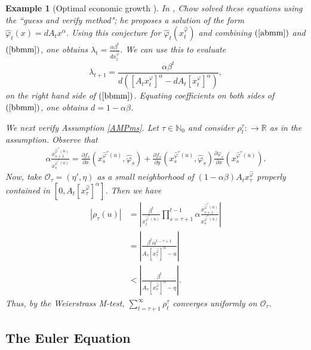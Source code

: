 \documentclass[3p]{elsarticle}
\newcommand{\rz}{\mathbb R}
\newcommand{\nat}{\mathbb N_0}
\newtheorem{examp}[thm]{Example}
\begin{document}
\begin{examp}[Optimal economic growth \cite{EconomicGrowth,Ljungq}]
		
		In \cite[pp.33]{LagrangeMethod}, Chow solved these  equations using the ``guess and verify method"; he proposes a solution of the form ${\hat\varphi}_t(x)=dA_tx^\alpha$. Using this conjecture for $\hat\varphi_t(x_t^{\hat\varphi})$ and combining $(\ref{abmm})$ and $(\ref{bbmm})$, one obtains $\displaystyle\lambda_t=\frac{\alpha\beta^t}{dx_t^{\hat\varphi}}$. We can use this to evaluate $$\displaystyle\lambda_{t+1}=\frac{\alpha\beta^t}{d([A_tx_t^{\varphi}]^\alpha-dA_t[x_t^{\varphi}]^\alpha)},$$ on the right hand side of $(\ref{bbmm})$. Equating coefficients on both sides of $(\ref{bbmm})$, one obtains $d=1-\alpha\beta$. 
		
		We next verify Assumption \ref{AMPms}. Let $\tau\in\nat$ and consider $\rho_t^\tau:\to\rz$ as in the assumption. Observe that 
		\begin{align*}
		\alpha\frac{x_{s+1}^{\hat\varphi^\tau(u)}}{x_s^{\hat\varphi^\tau(u)}}=\frac{\partial f_s}{\partial x}\left( x_s^{{\hat\varphi^\tau(u)}}, \hat \varphi_s\right) + \frac{\partial f_s}{\partial y}\left( x_s^{{\hat\varphi^\tau(u)}}, \hat \varphi_s\right)\frac{\partial \varphi_s}{\partial x}\left( x_s^{\hat{\varphi}^\tau(u)}\right).
		\end{align*}
		Now, take $\mathcal O_\tau=(\eta',\eta)$ as a small neighborhood of $(1-\alpha\beta)A_t x_\tau^{\hat\varphi}$ properly contained in $[0,A_t[x_\tau^{\hat\varphi}]^\alpha]$. Then we have
		\begin{align*}
		\left|\rho_{\tau}(u)\right|&=\left|\frac{\beta^t}{x_t^{\hat\varphi^\tau(u)}}\prod_{s=\tau+1}^{t-1}\alpha\frac{x_{s+1}^{\hat\varphi^\tau(u)}}{x_s^{\hat\varphi^\tau(u)}}\right|\\
		&=\left| \frac{\beta^t \alpha^{t-\tau+1}}{A_\tau[x_\tau^{\hat\varphi}]^\alpha-u}\right| \\
		&<\left|\frac{\beta^t}{A_\tau [x_\tau^{\hat\varphi}]^\alpha-\eta}\right|.
		\end{align*}
		Thus, by the Weierstrass M-test, $\displaystyle\sum_{t=\tau+1}^{\infty}\rho_t^\tau$ converges uniformly on $\mathcal O_\tau$.
	\end{examp}
	
	
	
	
	
	
	
	
	
	
	
	
	
	
	
	
	
	
	
	
	\subsection{The Euler Equation}
	
\end{document}
